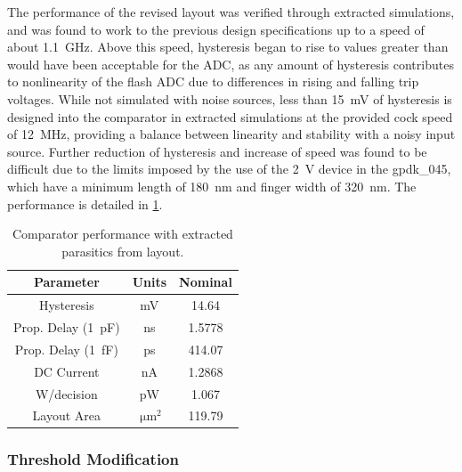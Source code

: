 \documentclass[11pt,letterpaper]{article}
\begin{document}
The performance of the revised layout was verified through extracted simulations, and was found to work to the previous design specifications up to a speed of about \qty{1.1}{\GHz}. Above this speed, hysteresis began to rise to values greater than would have been acceptable for the ADC, as any amount of hysteresis contributes to nonlinearity of the flash ADC due to differences in rising and falling trip voltages. While not simulated with noise sources, less than \qty{15}{\mV} of hysteresis is designed into the comparator in extracted simulations at the provided cock speed of \qty{12}{\MHz}, providing a balance between linearity and stability with a noisy input source. Further reduction of hysteresis and increase of speed was found to be difficult due to the limits imposed by the use of the \qty{2}{\V} device in the gpdk\_045, which have a minimum length of \qty{180}{\nm} and finger width of \qty{320}{\nm}. The performance is detailed in \cref{tab:comp_perf}.

\begin{table}[]
    \centering
    \begin{tabular}{ccc}
    \toprule
        Parameter & Units & Nominal \\
    \midrule
        Hysteresis & mV & 14.64 \\
        Prop. Delay (\qty{1}{\pF}) & ns & 1.5778 \\
        Prop. Delay (\qty{1}{\fF}) & ps & 414.07 \\
        DC Current & nA & 1.2868 \\
        W/decision & pW & 1.067 \\
        Layout Area & \(\qty{}{\um^2}\) & 119.79 \\
    \bottomrule
        
    \end{tabular}
    \caption{Comparator performance with extracted parasitics from layout.}\label{tab:comp_perf}
\end{table}

\subsubsection{Threshold Modification}
\end{document}
